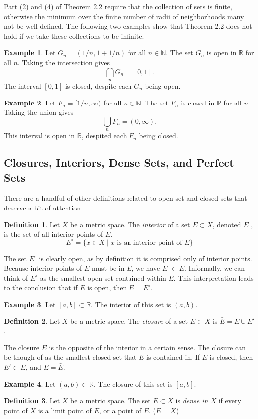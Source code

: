\documentclass{article}
\newcommand{\N}{\mathbb{N}}
\newcommand{\R}{\mathbb{R}}
\theoremstyle{definition}
\newtheorem{definition}{Definition}[section]
\newtheorem{example}{Example}[section]
\begin{document}
Part (2) and (4) of Theorem 2.2 require that the collection of sets is finite, otherwise the minimum over the finite number of radii of neighborhoods many not be well defined. The following two examples show that Theorem 2.2 does not hold if we take these collections to be infinite. 
\begin{example}
	Let $ G_n=(1/n,1+1/n) $ for all $ n\in\N $. The set $ G_n $ is open in $ \R $ for all $ n $. Taking the intersection gives $$\bigcap_n G_n=[0,1] .$$ The interval $ [0,1] $ is closed, despite each $ G_n $ being open.  
\end{example}
\begin{example}
	Let $ F_n=[1/n,\infty) $ for all $ n\in\N $. The set $ F_n $ is closed in $ \R $ for all $ n $. Taking the union gives $$ \bigcup_{n}F_n=(0,\infty).$$ This interval is open in $ \R $, despited each $ F_n $ being closed.
\end{example}
\subsection{Closures, Interiors, Dense Sets, and Perfect Sets} 
There are a handful of other definitions related to open set and closed sets that deserve a bit of attention.
\begin{definition}
Let $ X $ be a metric space. The \textit{\color{red}interior} of a set $ E\subset X $, denoted $ E^\circ $, is the set of all interior points of $ E $. $$ E^\circ=\{x\in X\mid x\text{ is an interior point of }E \} $$
\end{definition}
The set $ E^\circ $ is clearly open, as by definition it is comprised only of interior points. Because interior points of $ E $ must be in $ E $, we have $ E^\circ \subset E $. Informally, we can think of $ E^\circ $ as the smallest open set contained within $ E $. This interpretation leads to the conclusion that if $ E $ is open, then $ E=E^\circ $.
\begin{example}
	Let $ [a,b]\subset\R $. The interior of this set is $ (a,b) $. 
\end{example}
\begin{definition}
	Let $ X $ be a metric space. The \textit{\color{red}closure} of a set $ E\subset X $ is $ \bar{E}=E\cup E' $. 
\end{definition}
The closure $ \bar{E} $ is the opposite of the interior in a certain sense. The closure can be though of as the smallest closed set that $ E $ is contained in. If $ E $ is closed, then $ E'\subset E $, and $ E=\bar{E} $.
\begin{example}
	Let $ (a,b)\subset\R $. The closure of this set is $ [a,b] $. 
\end{example}
\begin{definition}
	Let $ X $ be a metric space. The set $ E\subset X $ is \textit{\color{red}dense in $ X $} if every point of $ X $ is a limit point of $ E $, or a point of $ E $. ($ \bar{E}=X $)  
\end{definition}
\end{document}
